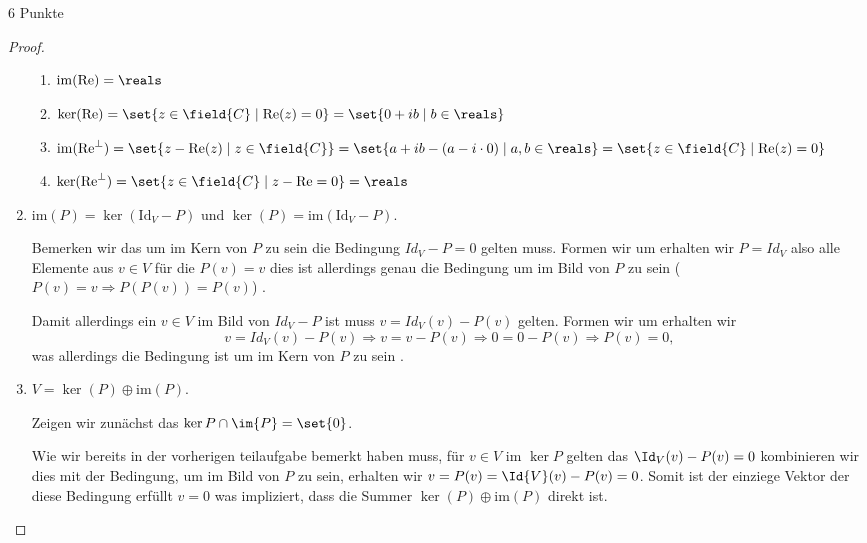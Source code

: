 \documentclass{problemset}
\begin{document}
\begin{problem}[Projektionen]{6 Punkte}
\begin{proof}
\begin{enumerate}
              \begin{enumerate}
                  \item $\operatorname{im}(\operatorname{Re}) = \reals$ \checkmark
                  \item $\ker(\operatorname{Re}) = \set{z \in \field{C} \mid \operatorname{Re}(z) = 0} = \set{0 + ib \mid b \in \reals}$ \checkmark
                  \item $\operatorname{im}(\operatorname{Re}^\perp) = \set{ z - \operatorname{Re}(z) \mid z \in \field{C}} = \set { a + ib - (a - i \cdot 0) \mid a,b \in \reals} = \set{ z \in \field{C} \mid \operatorname{Re}(z) = 0}$ \checkmark
                  \item $\operatorname{ker}(\operatorname{Re}^\perp) = \set{ z \in \field{C} \mid z - \operatorname{Re} = 0} = \reals $ \checkmark

              \end{enumerate}

        \item $\text{im}(P) = \ker(\text{Id}_V - P)$ und $\ker(P) = \text{im}(\text{Id}_V - P)$.

              Bemerken wir das um im Kern von $P$ zu sein die Bedingung $Id_V - P = 0$ gelten
              muss. Formen wir um erhalten wir $P = Id_V$ also alle Elemente aus $v \in V$
              für die $P(v) = v$ dies ist allerdings genau die Bedingung um im Bild von $P$
              zu sein ($P(v) = v \Rightarrow P(P(v)) = P(v)$) \checkmark.

              Damit allerdings ein $v \in V$ im Bild von $Id_V - P$ ist muss $v = Id_V(v) -
                  P(v)$ gelten. Formen wir um erhalten wir \[
                  v = Id_V(v) - P(v) \Rightarrow v = v - P(v) \Rightarrow 0 = 0 - P(v) \Rightarrow P(v) = 0,
              \] was allerdings die Bedingung ist um im Kern von $P$ zu sein \checkmark.

        \item $V = \ker(P) \oplus \text{im}(P)$.

              Zeigen wir zunächst das $\ker{P} \cap \im{P} = \set{0}$.

              Wie wir bereits in der vorherigen teilaufgabe bemerkt haben muss, für $v \in V$
              im $\ker P$ gelten das $\Id_V(v) - P(v) = 0$ kombinieren wir dies mit der
              Bedingung, um im Bild von $P$ zu sein, erhalten wir $v = P(v) = \Id{V}(v) -
                  P(v) = 0$. Somit ist der einziege Vektor der diese Bedingung erfüllt $v = 0$
              was impliziert, dass die Summer $\ker(P) \oplus \text{im}(P)$ direkt ist.


\end{enumerate}
\end{proof}
\end{problem}
\end{document}
